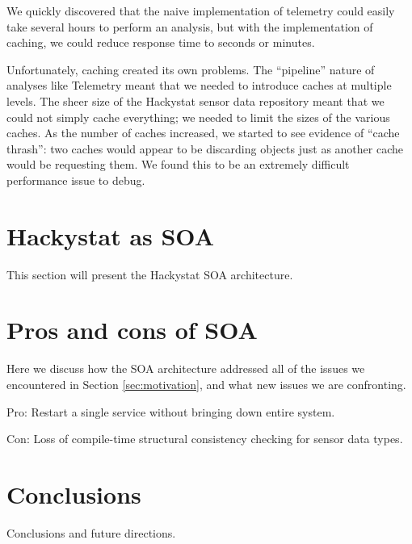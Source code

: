 \documentclass[conference,12pt]{IEEEtran}
\begin{document}
We quickly discovered that the naive implementation of telemetry could easily take several hours to perform an analysis, but with the implementation of caching, we could reduce response time to seconds or minutes.  

Unfortunately, caching created its own problems. The ``pipeline'' nature of analyses like Telemetry meant that we needed to introduce caches at multiple levels.  The sheer size of the Hackystat sensor data repository meant that we could not simply cache everything; we needed to limit the sizes of the various caches.  As the number of caches increased, we started to see evidence of ``cache thrash'': two caches would appear to be discarding objects just as another cache would be requesting them. We found this to be an extremely difficult performance issue to debug.


\section{Hackystat as SOA}
\label{sec:soa}

This section will present the Hackystat SOA architecture.

\section{Pros and cons of SOA}
\label{sec:discussion}

Here we discuss how the SOA architecture addressed all of the issues we encountered in Section \ref{sec:motivation}, and what new issues we are confronting. 

Pro: Restart a single service without bringing down entire system.

Con: Loss of compile-time structural consistency checking for sensor data types.

\section{Conclusions}
\label{sec:conclusion}

Conclusions and future directions. 




\end{document}
